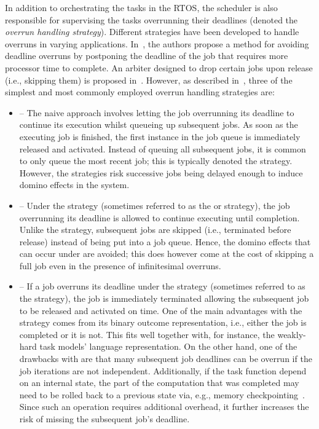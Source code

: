 In addition to orchestrating the tasks in the RTOS, the scheduler is also responsible for supervising the tasks overrunning their deadlines (denoted the \emph{overrun handling strategy}).
Different strategies have been developed to handle overruns in varying applications.
In~\cite{Caccamo:2002}, the authors propose a method for avoiding deadline overruns by postponing the deadline of the job that requires more processor time to complete.
An arbiter designed to drop certain jobs upon release (i.e., skipping them) is proposed in~\cite{Yoshimoto:2011}.
However, as described in~\cite{Cervin:2004b}, three of the simplest and most commonly employed overrun handling strategies are:
%
\begin{itemize}
    \item \tQ{} -- The naive approach involves letting the job overrunning its deadline to continue its execution whilst queueing up subsequent jobs.
        As soon as the executing job is finished, the first instance in the job queue is immediately released and activated.
        Instead of queuing all subsequent jobs, it is common to only queue the most recent job; this is typically denoted the \tQ{} strategy.
        However, the \tQ{} strategies risk successive jobs being delayed enough to induce domino effects in the system.

    \item \tS{} -- Under the \tS{} strategy (sometimes referred to as the  or  strategy), the job overrunning its deadline is allowed to continue executing until completion.
        Unlike the \tQ{} strategy, subsequent jobs are skipped (i.e., terminated before release) instead of being put into a job queue.
        Hence, the domino effects that can occur under \tQ{} are avoided; this does however come at the cost of skipping a full job even in the presence of infinitesimal overruns.

    \item \tK{} -- If a job overruns its deadline under the \tK{} strategy (sometimes referred to as the  strategy), the job is immediately terminated allowing the subsequent job to be released and activated on time.
        One of the main advantages with the \tK{} strategy comes from its binary outcome representation, i.e., either the job is completed or it is not.
        This fits well together with, for instance, the weakly-hard task models' language representation.
        On the other hand, one of the drawbacks with \tK{} are that many subsequent job deadlines can be overrun if the job iterations are not independent.
        Additionally, if the task function depend on an internal state, the part of the computation that was completed may need to be rolled back to a previous state via, e.g., memory checkpointing~\addref{}.
        Since such an operation requires additional overhead, it further increases the risk of missing the subsequent job's deadline.
\end{itemize}
